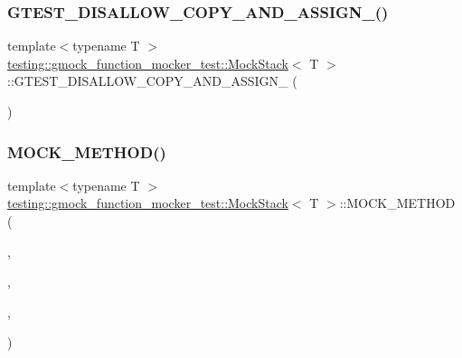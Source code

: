 \subsubsection{\texorpdfstring{GTEST\_DISALLOW\_COPY\_AND\_ASSIGN\_()}{GTEST\_DISALLOW\_COPY\_AND\_ASSIGN\_()}\hspace{0.1cm}{\footnotesize\ttfamily [2/2]}}
{\footnotesize\ttfamily template$<$typename T $>$ \\
\mbox{\hyperlink{classtesting_1_1gmock__function__mocker__test_1_1_mock_stack}{testing\+::gmock\+\_\+function\+\_\+mocker\+\_\+test\+::\+Mock\+Stack}}$<$ T $>$\+::G\+T\+E\+S\+T\+\_\+\+D\+I\+S\+A\+L\+L\+O\+W\+\_\+\+C\+O\+P\+Y\+\_\+\+A\+N\+D\+\_\+\+A\+S\+S\+I\+G\+N\+\_\+ (\begin{DoxyParamCaption}\item[{\mbox{\hyperlink{classtesting_1_1gmock__function__mocker__test_1_1_mock_stack}{Mock\+Stack}}$<$ T $>$}]{ }\end{DoxyParamCaption})\hspace{0.3cm}{\ttfamily [private]}}

\mbox{\label{classtesting_1_1gmock__function__mocker__test_1_1_mock_stack_a1012c16764c3ca2626032cd95d6c5f89}} 
\subsubsection{\texorpdfstring{MOCK\_METHOD()}{MOCK\_METHOD()}\hspace{0.1cm}{\footnotesize\ttfamily [1/12]}}
{\footnotesize\ttfamily template$<$typename T $>$ \\
\mbox{\hyperlink{classtesting_1_1gmock__function__mocker__test_1_1_mock_stack}{testing\+::gmock\+\_\+function\+\_\+mocker\+\_\+test\+::\+Mock\+Stack}}$<$ T $>$\+::M\+O\+C\+K\+\_\+\+M\+E\+T\+H\+OD (\begin{DoxyParamCaption}\item[{void}]{,  }\item[{\mbox{\hyperlink{classtesting_1_1gmock__function__mocker__test_1_1_stack_interface_a94f18eeca0a9ef27ffdaffab40eaa5b7}{Push}}}]{,  }\item[{(const T \&elem)}]{,  }\item[{()}]{ }\end{DoxyParamCaption})}

